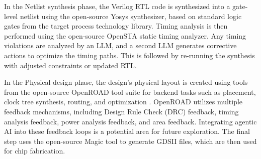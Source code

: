 In the Netlist synthesis phase, the Verilog RTL code is synthesized into a gate-level netlist using the open-source Yosys synthesizer, based on standard logic gates from the target process technology library. Timing analysis is then performed using the open-source OpenSTA static timing analyzer. Any timing violations are analyzed by an LLM, and a second LLM generates corrective actions to optimize the timing paths. This is followed by re-running the synthesis with adjusted constraints or updated RTL. 

In the Physical design phase, the design's physical layout is created using tools from the open-source OpenROAD tool suite for backend tasks such as placement, clock tree synthesis, routing, and optimization \cite{ajayi2019openroad, ajayi2019toward}. OpenROAD utilizes multiple feedback mechanisms, including Design Rule Check (DRC) feedback, timing analysis feedback, power analysis feedback, and area feedback. Integrating agentic AI into these feedback loops is a potential area for future exploration. The final step uses the open-source Magic tool to generate GDSII files, which are then used for chip fabrication.



